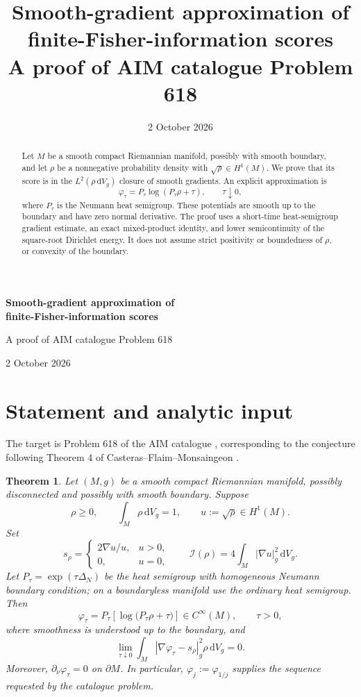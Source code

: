 \documentclass[11pt]{article}
\title{\vspace{-10mm}\textbf{Smooth-gradient approximation of\\ finite-Fisher-information scores}\\[5pt]\large A proof of AIM catalogue Problem 618}
\author{}
\date{2 October 2026}
\newtheorem{theorem}{Theorem}
\newcommand{\dd}{\,\mathrm{d}}
\newcommand{\dV}{\dd V_g}
\newcommand{\I}{\mathcal I}
\begin{document}
\thispagestyle{plain}
\begin{center}
{\Large\bfseries Smooth-gradient approximation of\\[2pt]
finite-Fisher-information scores}\par
\vspace{6pt}
{\large A proof of AIM catalogue Problem 618}\par
\vspace{10pt}
2 October 2026
\end{center}
\vspace{2pt}
\begin{abstract}
Let $M$ be a smooth compact Riemannian manifold, possibly with smooth boundary, and let $\rho$ be a nonnegative probability density with $\sqrt\rho\in H^1(M)$. We prove that its score is in the $L^2(\rho\,\mathrm{d}V_g)$ closure of smooth gradients. An explicit approximation is
\[
 \varphi_\tau=P_\tau\log(P_\tau\rho+\tau),\qquad \tau\downarrow0,
\]
where $P_\tau$ is the Neumann heat semigroup. These potentials are smooth up to the boundary and have zero normal derivative. The proof uses a short-time heat-semigroup gradient estimate, an exact mixed-product identity, and lower semicontinuity of the square-root Dirichlet energy. It does not assume strict positivity or boundedness of $\rho$, or convexity of the boundary.
\end{abstract}

\section{Statement and analytic input}
The target is Problem 618 of the AIM catalogue \cite{AIM}, corresponding to the conjecture following Theorem 4 of Casteras--Flaim--Monsaingeon \cite{CFM}.

\begin{theorem}\label{thm:main}
Let $(M,g)$ be a smooth compact Riemannian manifold, possibly disconnected and possibly with smooth boundary. Suppose
\[
 \rho\geq0,\qquad \int_M\rho\dV=1,\qquad u:=\sqrt\rho\in H^1(M).
\]
Set
\[
 s_\rho=\begin{cases}2\nabla u/u,&u>0,\\0,&u=0,\end{cases}
 \qquad \I(\rho)=4\int_M|\nabla u|_g^2\dV.
\]
Let $P_\tau=\exp(\tau\Delta_N)$ be the heat semigroup with homogeneous Neumann boundary condition; on a boundaryless manifold use the ordinary heat semigroup. Then
\begin{equation}\label{eq:construction}
 \varphi_\tau=P_\tau\!\left[\log\big(P_\tau\rho+\tau\big)\right]
 \in C^\infty(M),\qquad \tau>0,
\end{equation}
where smoothness is understood up to the boundary, and
\begin{equation}\label{eq:conclusion}
 \lim_{\tau\downarrow0}\int_M|\nabla\varphi_\tau-s_\rho|_g^2\rho\dV=0.
\end{equation}
Moreover, $\partial_\nu\varphi_\tau=0$ on $\partial M$. In particular, $\varphi_j:=\varphi_{1/j}$ supplies the sequence requested by the catalogue problem.
\end{theorem}
\end{document}
